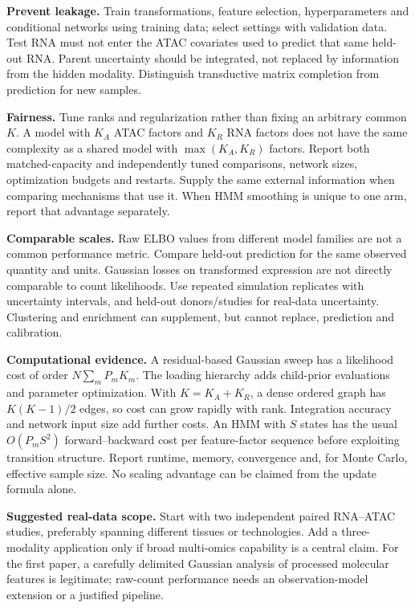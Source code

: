 \documentclass[11pt,a4paper]{article}
\numberwithin{equation}{section}
\begin{document}
\textbf{Prevent leakage.} Train transformations, feature selection,
hyperparameters and conditional networks using training data; select
settings with validation data. Test RNA must not enter the ATAC covariates
used to predict that same held-out RNA. Parent uncertainty should be
integrated, not replaced by information from the hidden modality.
Distinguish transductive matrix completion from prediction for new samples.

\textbf{Fairness.} Tune ranks and regularization rather than fixing an
arbitrary common \(K\). A model with \(K_A\) ATAC factors and \(K_R\) RNA
factors does not have the same complexity as a shared model with
\(\max(K_A,K_R)\) factors. Report both matched-capacity and independently
tuned comparisons, network sizes, optimization budgets and restarts.
Supply the same external information when comparing mechanisms that use
it. When HMM smoothing is unique to one arm, report that advantage separately.

\textbf{Comparable scales.} Raw ELBO values from different model families
are not a common performance metric. Compare held-out prediction for the
same observed quantity and units. Gaussian losses on transformed
expression are not directly comparable to count likelihoods.
Use repeated simulation replicates with uncertainty intervals, and
held-out donors/studies for real-data uncertainty.
Clustering and enrichment can supplement, but cannot replace, prediction
and calibration.

\textbf{Computational evidence.} A residual-based Gaussian sweep has a
likelihood cost of order \(N\sum_m P_mK_m\). The loading hierarchy adds
child-prior evaluations and parameter optimization. With \(K=K_A+K_R\),
a dense ordered graph has \(K(K-1)/2\) edges, so cost can grow rapidly with
rank. Integration accuracy and network input size add further costs.
An HMM with \(S\) states has the usual \(O(P_mS^2)\) forward--backward
cost per feature-factor sequence before exploiting transition structure.
Report runtime, memory, convergence and, for Monte Carlo, effective sample
size. No scaling advantage can be claimed from the update formula alone.

\textbf{Suggested real-data scope.} Start with two independent paired
RNA--ATAC studies, preferably spanning different tissues or technologies.
Add a three-modality application only if broad multi-omics capability is
a central claim. For the first paper, a carefully delimited Gaussian
analysis of processed molecular features is legitimate; raw-count
performance needs an observation-model extension or a justified pipeline.
\end{document}

